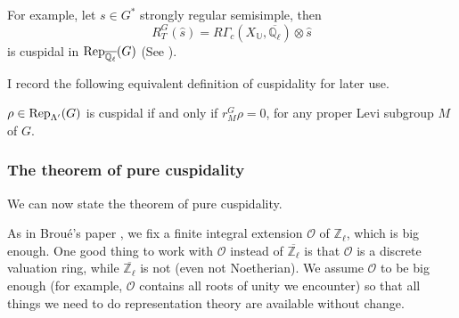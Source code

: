 	For example, let $s \in G^*$ strongly regular semisimple, then 
	$$R_T^G(\hat{s})=R\Gamma_c(X_{\mathbb{U}}, \overline{\mathbb{Q}_\ell})\otimes \hat{s}$$ 
	is cuspidal in $\operatorname{\operatorname{Rep}}_{\overline{\mathbb{Q}_{\ell}}}(G)$ (See \cite[Theorem 8.3]{deligne1976representations}). 
	
	I record the following equivalent definition of cuspidality for later use.
	
	\begin{lemma}\cite[II.2.3]{vigneras1996representations}\label{Lemma Cuspidal}
		$\rho \in \operatorname{\operatorname{Rep}}_{\Lambda'}(G)$ is cuspidal if and only if $r_M^G\rho=0$, for any proper Levi subgroup $M$ of $G$.
	\end{lemma}
	
%	
	
	

	
	
	\subsubsection{The theorem of pure cuspidality}
	
	We can now state the theorem of pure cuspidality. 
	
	As in Broué's paper \cite{broue1990isometries}, we fix a finite integral extension $\mathcal{O}$ of $\mathbb{Z}_{\ell}$, which is big enough. One good thing to work with $\mathcal{O}$ instead of $\overline{\mathbb{Z}_{\ell}}$ is that $\mathcal{O}$ is a discrete valuation ring, while $\overline{\mathbb{Z}_{\ell}}$ is not (even not Noetherian). We assume $\mathcal{O}$ to be big enough (for example, $\mathcal{O}$ contains all roots of unity we encounter) so that all things we need to do representation theory are available without change.
	
